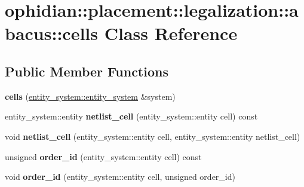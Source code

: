 \hypertarget{classophidian_1_1placement_1_1legalization_1_1abacus_1_1cells}{\section{ophidian\-:\-:placement\-:\-:legalization\-:\-:abacus\-:\-:cells Class Reference}
\label{classophidian_1_1placement_1_1legalization_1_1abacus_1_1cells}
}
\subsection*{Public Member Functions}
\begin{DoxyCompactItemize}
\item 
\hypertarget{classophidian_1_1placement_1_1legalization_1_1abacus_1_1cells_ad343dfc5b984d0af66dfd0a10f9cbb3f}{{\bfseries cells} (\hyperlink{classophidian_1_1entity__system_1_1entity__system}{entity\-\_\-system\-::entity\-\_\-system} \&system)}\label{classophidian_1_1placement_1_1legalization_1_1abacus_1_1cells_ad343dfc5b984d0af66dfd0a10f9cbb3f}

\item 
\hypertarget{classophidian_1_1placement_1_1legalization_1_1abacus_1_1cells_af9ed878f0bcf2bd9e04dec2bdadf96ca}{entity\-\_\-system\-::entity {\bfseries netlist\-\_\-cell} (entity\-\_\-system\-::entity cell) const }\label{classophidian_1_1placement_1_1legalization_1_1abacus_1_1cells_af9ed878f0bcf2bd9e04dec2bdadf96ca}

\item 
\hypertarget{classophidian_1_1placement_1_1legalization_1_1abacus_1_1cells_a14e45c550dc5557eec4d337372a8a7af}{void {\bfseries netlist\-\_\-cell} (entity\-\_\-system\-::entity cell, entity\-\_\-system\-::entity netlist\-\_\-cell)}\label{classophidian_1_1placement_1_1legalization_1_1abacus_1_1cells_a14e45c550dc5557eec4d337372a8a7af}

\item 
\hypertarget{classophidian_1_1placement_1_1legalization_1_1abacus_1_1cells_a5998f461205d9f58e1fedfea895b75cb}{unsigned {\bfseries order\-\_\-id} (entity\-\_\-system\-::entity cell) const }\label{classophidian_1_1placement_1_1legalization_1_1abacus_1_1cells_a5998f461205d9f58e1fedfea895b75cb}

\item 
\hypertarget{classophidian_1_1placement_1_1legalization_1_1abacus_1_1cells_a020ad3922de9e08d170b1ddc08b75a77}{void {\bfseries order\-\_\-id} (entity\-\_\-system\-::entity cell, unsigned order\-\_\-id)}\label{classophidian_1_1placement_1_1legalization_1_1abacus_1_1cells_a020ad3922de9e08d170b1ddc08b75a77}


\end{DoxyCompactItemize}
